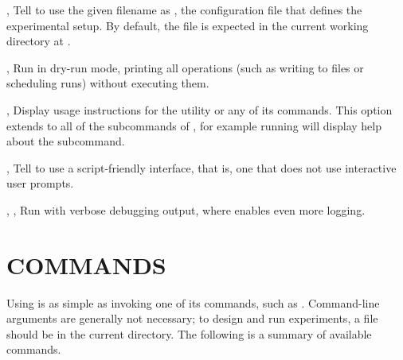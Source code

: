 \documentclass[a4paper,english]{article}
\begin{document}
\begin{adjustwidth}{18pt}{0pt}
        \begin{Description}[Options]
            \item[\OptArg{-c}{ filename}, \OptArg{--config}{ filename}]
            Tell  to use the given filename as , the configuration
            file that defines the experimental setup.
            By default, the file is expected in the current working directory at .
            \item[\Opt{-d}, \Opt{--dry}]
            Run  in dry-run mode, printing all operations (such as writing to files or scheduling runs)
            without executing them.
            \item[\Opt{-h}, \Opt{--help}]
            Display usage instructions for the  utility or any of its commands.
            This option extends to all of the subcommands of , for example running
               will display help about the  subcommand.
            \item[\Opt{-s}, \Opt{--script}]
            Tell  to use a script-friendly interface, that is, one that does not use
            interactive user prompts.
            \item[\Opt{-v}, \Opt{-vv}, \Opt{--verbose}]
            Run  with verbose debugging output, where  enables even more logging.
        \end{Description}

    \section{COMMANDS}

        Using  is as simple as invoking one of its commands, such as
         .
        Command-line arguments are generally not necessary; to design and run
        experiments, a  file should be in the current directory.
        The following is a summary of available commands.


\end{adjustwidth}
\end{document}
